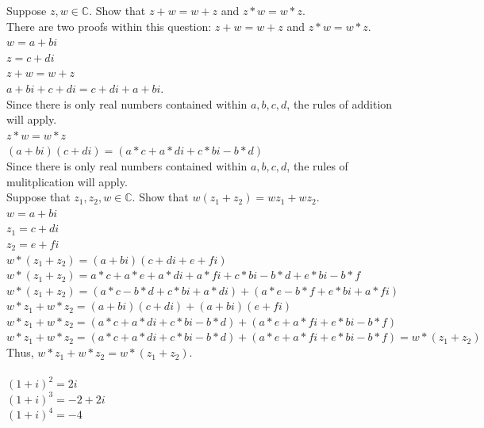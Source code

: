 \documentclass[12pt]{article}
\begin{document}
 Suppose $z,w \in \mathbb{C}$. Show that $z + w = w + z$ and $z * w = w * z$.\\

There are two proofs within this question: $z + w = w + z$ and $z * w = w * z$.\\
$w = a + bi$\\
$z = c + di$\\

$z + w = w + z$\\
$a + bi + c + di = c + di + a + bi$.\\
Since there is only real numbers contained within $a,b,c,d$, the rules of addition will apply.\\


$z * w = w * z$\\
$(a + bi)(c + di) = (a*c + a*di + c*bi - b*d)$\\
Since there is only real numbers contained within $a,b,c,d$, the rules of mulitplication will apply.\\


 Suppose that $z_1,z_2,w \in \mathbb{C}$. Show that $w(z_1+z_2) = wz_1 + wz_2$.\\

$w = a + bi$\\
$z_1 = c + di$\\
$z_2 = e + fi$\\

$w*(z_1 + z_2) = (a + bi)(c + di + e + fi)$\\
$w*(z_1 + z_2) = a*c + a*e + a*di + a*fi + c*bi - b*d + e*bi - b*f$\\
$w*(z_1 + z_2) = (a*c - b*d + c*bi + a*di) + (a*e - b*f + e*bi + a*fi)$\\
$w*z_1 + w*z_2 = (a+bi)(c+di) + (a+bi)(e+fi)$\\
$w*z_1 + w*z_2 = (a*c + a*di + c*bi - b*d) + (a*e + a*fi + e*bi - b*f)$\\

$w*z_1 + w*z_2 = (a*c + a*di + c*bi - b*d) + (a*e + a*fi + e*bi - b*f) = w*(z_1 + z_2)$\\

Thus, $w*z_1 + w*z_2 = w*(z_1 + z_2)$.\\

\\
$(1+i)^2 = 2i$\\
$(1+i)^3 = -2 + 2i$\\
$(1+i)^4 = -4$\\
\end{document}
